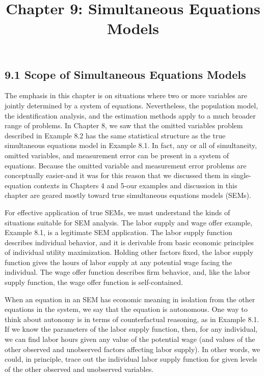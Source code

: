 \documentclass[10pt]{article}
\title{Chapter 9: Simultaneous Equations Models}
\author{}
\date{}
\begin{document}
\maketitle

\subsection*{9.1 Scope of Simultaneous Equations Models}
The emphasis in this chapter is on situations where two or more variables are jointly determined by a system of equations. Nevertheless, the population model, the identification analysis, and the estimation methods apply to a much broader range of problems. In Chapter 8, we saw that the omitted variables problem described in Example 8.2 has the same statistical structure as the true simultaneous equations model in Example 8.1. In fact, any or all of simultaneity, omitted variables, and measurement error can be present in a system of equations. Because the omitted variable and measurement error problems are conceptually easier-and it was for this reason that we discussed them in single-equation contexts in Chapters 4 and 5-our examples and discussion in this chapter are geared mostly toward true simultaneous equations models (SEMs).

For effective application of true SEMs, we must understand the kinds of situations suitable for SEM analysis. The labor supply and wage offer example, Example 8.1, is a legitimate SEM application. The labor supply function describes individual behavior, and it is derivable from basic economic principles of individual utility maximization. Holding other factors fixed, the labor supply function gives the hours of labor supply at any potential wage facing the individual. The wage offer function describes firm behavior, and, like the labor supply function, the wage offer function is self-contained.

When an equation in an SEM has economic meaning in isolation from the other equations in the system, we say that the equation is autonomous. One way to think about autonomy is in terms of counterfactual reasoning, as in Example 8.1. If we know the parameters of the labor supply function, then, for any individual, we can find labor hours given any value of the potential wage (and values of the other observed and unobserved factors affecting labor supply). In other words, we could, in principle, trace out the individual labor supply function for given levels of the other observed and unobserved variables.
\end{document}
